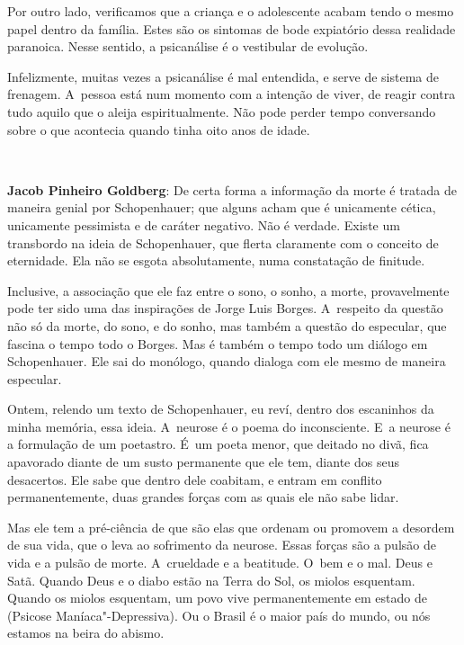 Por outro lado, verificamos que a criança e o adolescente acabam tendo o
mesmo papel dentro da família. Estes são os sintomas de bode expiatório
dessa realidade paranoica. Nesse sentido, a psicanálise é o vestibular
de evolução.

Infelizmente, muitas vezes a psicanálise é mal entendida, e serve de
sistema de frenagem. A~pessoa está num momento com a intenção de viver,
de reagir contra tudo aquilo que o aleija espiritualmente. Não pode
perder tempo conversando sobre o que acontecia quando tinha oito anos de
idade.

\begin{center}\asterisc{}\ ~\end{center}

\abrefala

\textbf{Jacob Pinheiro Goldberg}: De certa forma a informação da morte
é tratada de maneira genial por Schopenhauer; que alguns acham que é
unicamente cética, unicamente pessimista e de caráter negativo. Não é
verdade. Existe um transbordo na ideia de Schopenhauer, que flerta
claramente com o conceito de eternidade. Ela não se esgota
absolutamente, numa constatação de finitude.

 

Inclusive, a associação que ele faz entre o sono, o sonho, a morte,
provavelmente pode ter sido uma das inspirações de Jorge Luis Borges. A~respeito da questão não só da morte, do sono, e do sonho, mas também a
questão do especular, que fascina o tempo todo o Borges. Mas é também o
tempo todo um diálogo em Schopenhauer. Ele sai do monólogo, quando
dialoga com ele mesmo de maneira especular.

 

Ontem, relendo um texto de Schopenhauer, eu reví, dentro dos escaninhos
da minha memória, essa ideia. A~neurose é o poema do inconsciente. E~a
neurose é a formulação de um poetastro. É~um poeta menor, que deitado no
divã, fica apavorado diante de um susto permanente que ele tem, diante
dos seus desacertos. Ele sabe que dentro dele coabitam, e entram em
conflito permanentemente, duas grandes forças com as quais ele não sabe
lidar.

 

Mas ele tem a pré-ciência de que são elas que ordenam ou promovem a
desordem de sua vida, que o leva ao sofrimento da neurose. Essas forças
são a pulsão de vida e a pulsão de morte. A~crueldade e a beatitude. O~bem e o mal. Deus e Satã. Quando Deus e o diabo estão na Terra do Sol,
os miolos esquentam. Quando os miolos esquentam, um povo vive
permanentemente em estado de  (Psicose Maníaca"-Depressiva). Ou o
Brasil é o maior país do mundo, ou nós estamos na beira do abismo.

